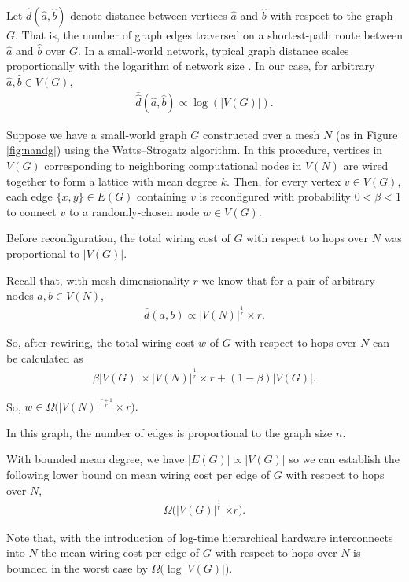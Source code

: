Let $\hat{d}(\hat{a},\hat{b})$ denote distance between vertices $\hat{a}$ and $\hat{b}$ with respect to the graph $G$.
That is, the number of graph edges traversed on a shortest-path route between $\hat{a}$ and $\hat{b}$ over $G$.
In a small-world network, typical graph distance scales proportionally with the logarithm of network size .
In our case, for arbitrary $\hat{a},\hat{b} \in V(G)$,
\begin{align} \label{eqn:smallworld_prop}
\bar{\hat{d}}(\hat{a},\hat{b}) \propto \log(|V(G)|).
\end{align}

Suppose we have a small-world graph $G$ constructed over a mesh $N$ (as in Figure \ref{fig:nandg}) using the Watts–Strogatz algorithm.
In this procedure, vertices in $V(G)$ corresponding to neighboring computational nodes in $V(N)$ are wired together to form a lattice with mean degree $k$.
Then, for every vertex $v \in V(G)$, each edge $\{x, y\} \in E(G)$ containing $v$ is reconfigured with probability $0 < \beta < 1$ to connect $v$ to a randomly-chosen node $w \in V(G)$.

Before reconfiguration, the total wiring cost of $G$ with respect to hops over $N$ was proportional to $|V(G)|$.

Recall that, with mesh dimensionality $r$ we know that for a pair of arbitrary nodes $a,b \in V(N)$,
\begin{align*}
\bar{d}(a, b) \propto |V(N)|^{\frac{1}{r}} \times r.
\end{align*}

So, after rewiring, the total wiring cost $w$ of $G$ with respect to hops over $N$ can be calculated as
\begin{align*}
  \beta |V(G)| \times |V(N)|^{\frac{1}{r}} \times r + (1 - \beta) |V(G)|.
\end{align*}

So, $w \in \Omega \Big( |V(N)|^{\frac{r+1}{r}} \times r \Big).$

In this graph, the number of edges is proportional to the graph size $n$.

With bounded mean degree, we have $|E(G)| \propto |V(G)|$ so we can establish the following lower bound on mean wiring cost per edge of $G$ with respect to hops over $N$,
\begin{align*}
\Omega \Big( |V(G)|^{\frac{1}{r}}| \times r \Big).
\end{align*}

Note that, with the introduction of log-time hierarchical hardware interconnects into $N$ the mean wiring cost per edge of $G$ with respect to hops over $N$ is bounded in the worst case by $\Omega \Big( \log |V(G)| \Big)$.
